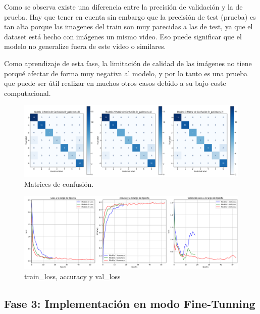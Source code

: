 \quad

\noindent
Como se observa existe una diferencia entre la precisión de validación y la de prueba.
Hay que tener en cuenta sin embargo que la precisión de test (prueba) es tan alta porque
las imagenes del train son muy parecidas a las de test, ya que el dataset está hecho con imágenes
un mismo video. Eso puede significar que el modelo no generalize fuera de este video o similares.

\quad

\noindent
Como aprendizaje de esta fase, la limitación de calidad de las imágenes no tiene porqué afectar
de forma muy negativa al modelo, y por lo tanto es una prueba que puede ser útil realizar en muchos 
otros casos debido a su bajo coste computacional.
\quad

\begin{figure}[H]
    \centering
    \centering
    \includegraphics[width=\textwidth]{imagenes/confusion_matrix_a_quitar.png}
    \caption{Matrices de confusión.}
    \label{fig:confusion_matrix}
\end{figure}

\begin{figure}[H]
    \centering
    \centering
    \includegraphics[width=\textwidth]{imagenes/loss_accuracy_validation_a_quitar.png}
    \caption{train\_loss, accuracy y val\_loss}
    \label{fig:loss_accuracy_validation}
\end{figure}


\subsection{Fase 3: Implementación en modo Fine-Tunning}

